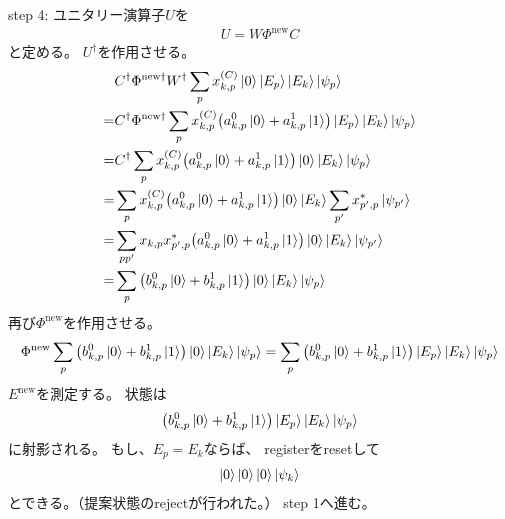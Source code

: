\documentclass[]{ltjsarticle}
\begin{document}
step 4:
ユニタリー演算子$U$を
\begin{align}
    U = W \Phi^\text{new} C
\end{align}
と定める。
$U^\dagger$を作用させる。
\begin{align}
    &C^\dagger\Phi^{\text{new}\dagger}W^\dagger
    \sum_p x_{k,p}^{(C)}
    \ket{0}
    \ket{E_p}
    \ket{E_k}
    \ket{\psi_p} \\
    =
    &C^\dagger\Phi^{\text{new}\dagger}
    \sum_p x_{k,p}^{(C)}
    \qty(
        a_{k,p}^0\ket{0}
        +
        a_{k,p}^1\ket{1}
    )
    \ket{E_p}
    \ket{E_k}
    \ket{\psi_p} \\
    =
    &C^\dagger
    \sum_p x_{k,p}^{(C)}
    \qty(
        a_{k,p}^0\ket{0}
        +
        a_{k,p}^1\ket{1}
    )
    \ket{0}
    \ket{E_k}
    \ket{\psi_p} \\
    =
    &
    \sum_p x_{k,p}^{(C)}
    \qty(
        a_{k,p}^0\ket{0}
        +
        a_{k,p}^1\ket{1}
    )
    \ket{0}
    \ket{E_k}
    \sum_{p'}
    x_{p',p}^*
    \ket{\psi_{p'}} \\
    =
    &\sum_{pp'} 
    x_{k,p}
    x_{p',p}^*
    \qty(
        a_{k,p}^0\ket{0}
        +
        a_{k,p}^1\ket{1}
    )
    \ket{0}
    \ket{E_k}
    \ket{\psi_{p'}} \\
    =
    &\sum_{p} 
    \qty(
        b_{k,p}^0\ket{0}
        +
        b_{k,p}^1\ket{1}
    )
    \ket{0}
    \ket{E_k}
    \ket{\psi_{p}}
\end{align}
再び$\Phi^\text{new}$を作用させる。
\begin{align}
    \Phi^\text{new}
    \sum_p
    \qty(
        b_{k,p}^0\ket{0}
        +
        b_{k,p}^1\ket{1}
    )
    \ket{0}
    \ket{E_k}
    \ket{\psi_{p}}
    =
    \sum_p
    \qty(
        b_{k,p}^0\ket{0}
        +
        b_{k,p}^1\ket{1}
    )
    \ket{E_p}
    \ket{E_k}
    \ket{\psi_{p}}
\end{align}
$E^\text{new}$を測定する。
状態は
\begin{align}
    \qty(
        b_{k,p}^0\ket{0}
        +
        b_{k,p}^1\ket{1}
    )
    \ket{E_p}
    \ket{E_k}
    \ket{\psi_{p}}
\end{align}
に射影される。
もし、$E_p = E_k$ならば、
registerをresetして
\begin{align}
    \ket{0}
    \ket{0}
    \ket{0}
    \ket{\psi_{k}}
\end{align}
とできる。（提案状態のrejectが行われた。）
step 1へ進む。
\end{document}
